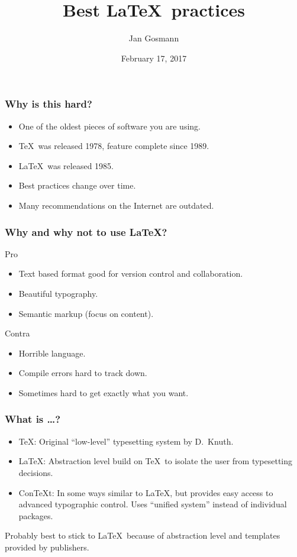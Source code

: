 \documentclass[aspectratio=1610]{beamer}
\title{Best \LaTeX\ practices}
\author{Jan Gosmann}
\date{February 17, 2017}
\begin{document}
\maketitle

\begin{frame}
    \frametitle{Why is this hard?}
    \begin{itemize}
        \item One of the oldest pieces of software you are using.
        \item \TeX\ was released 1978, feature complete since 1989.
        \item \LaTeX\ was released 1985.
        \item Best practices change over time.
        \item Many recommendations on the Internet are outdated.
    \end{itemize}
\end{frame}

\begin{frame}
    \frametitle{Why and why not to use \LaTeX?}
    \begin{block}{Pro}
        \begin{itemize}
            \item Text based format good for version control and collaboration.
            \item Beautiful typography.
            \item Semantic markup (focus on content).
        \end{itemize}
    \end{block}
    \begin{block}{Contra}
        \begin{itemize}
            \item Horrible language.
            \item Compile errors hard to track down.
            \item Sometimes hard to get exactly what you want.
        \end{itemize}
    \end{block}
\end{frame}

\begin{frame}
    \frametitle{What is \dots?}
    \begin{itemize}
        \item \TeX\@: Original ``low-level'' typesetting system by D.~Knuth.
        \item \LaTeX\@: Abstraction level build on \TeX\ to isolate the user from typesetting decisions.
        \item ConTeXt\@: In some ways similar to \LaTeX, but provides easy access to advanced typographic control. Uses ``unified system'' instead of individual packages.
    \end{itemize}
    Probably best to stick to \LaTeX\ because of abstraction level and templates provided by publishers.
\end{frame}
\end{document}
